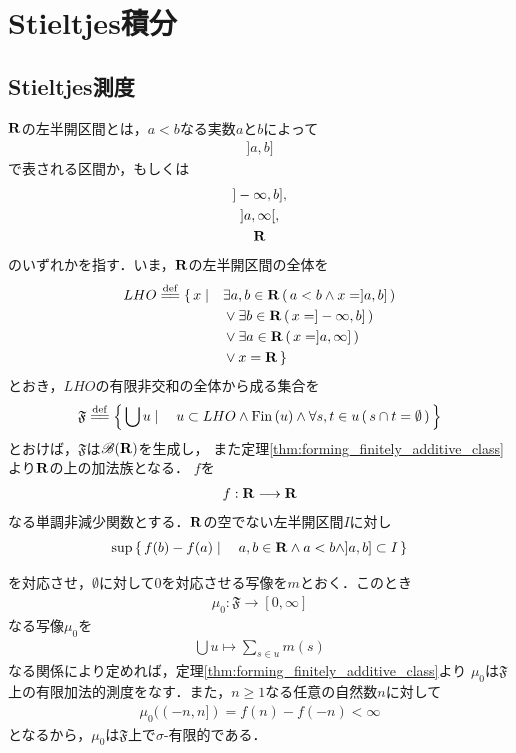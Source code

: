 \section{Stieltjes積分}
\subsection{Stieltjes測度}
	$\mathbf{R}$の左半開区間とは，$a < b$なる実数$a$と$b$によって
	\begin{align}
		]a,b]
	\end{align}
	で表される区間か，もしくは
	\begin{align}
		\begin{gathered}
			]-\infty,b],\\ 
			]a,\infty[,\\ 
			\mathbf{R}
		\end{gathered}
	\end{align}
	のいずれかを指す．いま，$\mathbf{R}$の左半開区間の全体を
	\begin{align}
		LHO \defeq \{\, x \mid \quad &\exists a,b \in \R\, (\, a < b \wedge x=]a,b] \, ) \\
		&\vee \exists b \in \R\, (\, x = ]-\infty,b]\, ) \\
		&\vee \exists a \in \R\, (\, x = ]a,\infty]\, ) \\
		&\vee x = \R\, \}
	\end{align}
	とおき，$LHO$の有限非交和の全体から成る集合を
	\begin{align}
		\mathfrak{F} \defeq \Set{\bigcup u}{u \subset LHO \wedge \Fin{u} 
		\wedge \forall s,t \in u\, (\, s \cap t = \emptyset\, )}
	\end{align}
	とおけば，$\mathfrak{F}$は$\mathscr{B}(\mathbf{R})$を生成し，
	また定理\ref{thm:forming_finitely_additive_class}より$\mathbf{R}$の上の加法族となる．
	$f$を
	\begin{align}
		f:\mathbf{R} \longrightarrow \mathbf{R}
	\end{align}
	なる単調非減少関数とする．$\mathbf{R}$の空でない左半開区間$I$に対し
	\begin{align}
		\operatorname*{sup}_{} \left\{\, f(b) - f(a) \mid \quad a,b \in \mathbf{R} \wedge a < b \wedge ]a,b] \subset I\, \right\}
	\end{align}
	を対応させ，$\emptyset$に対して$0$を対応させる写像を$m$とおく．このとき
	\begin{align}
		\mu_0:\mathfrak{F} \longrightarrow [0,\infty]
	\end{align}
	なる写像$\mu_0$を
	\begin{align}
		\bigcup u \longmapsto \sum_{s \in u}m(s)
	\end{align}
	なる関係により定めれば，定理\ref{thm:forming_finitely_additive_class}より
	$\mu_0$は$\mathfrak{F}$上の有限加法的測度をなす．また，$n \geq 1$なる任意の自然数$n$に対して
	\begin{align}
		\mu_0((-n,n]) = f(n) - f(-n) < \infty
	\end{align}
	となるから，$\mu_0$は$\mathfrak{F}$上で$\sigma$-有限的である．
	
